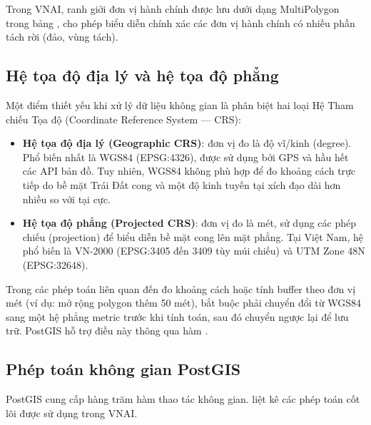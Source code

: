 Trong VNAI, ranh giới đơn vị hành chính được lưu dưới dạng MultiPolygon trong bảng , cho phép biểu diễn chính xác các đơn vị hành chính có nhiều phần tách rời (đảo, vùng tách).

\subsection{Hệ tọa độ địa lý và hệ tọa độ phẳng}

Một điểm thiết yếu khi xử lý dữ liệu không gian là phân biệt hai loại Hệ Tham chiếu Tọa độ (Coordinate Reference System --- CRS):
\begin{itemize}[leftmargin=*]
\item \textbf{Hệ tọa độ địa lý (Geographic CRS)}: đơn vị đo là độ vĩ/kinh (degree). Phổ biến nhất là WGS84 (EPSG:4326), được sử dụng bởi GPS và hầu hết các API bản đồ. Tuy nhiên, WGS84 không phù hợp để đo khoảng cách trực tiếp do bề mặt Trái Đất cong và một độ kinh tuyến tại xích đạo dài hơn nhiều so với tại cực.
\item \textbf{Hệ tọa độ phẳng (Projected CRS)}: đơn vị đo là mét, sử dụng các phép chiếu (projection) để biểu diễn bề mặt cong lên mặt phẳng. Tại Việt Nam, hệ phổ biến là VN-2000 (EPSG:3405 đến 3409 tùy múi chiếu) và UTM Zone 48N (EPSG:32648).
\end{itemize}

Trong các phép toán liên quan đến đo khoảng cách hoặc tính buffer theo đơn vị mét (ví dụ: mở rộng polygon thêm 50 mét), bắt buộc phải chuyển đổi từ WGS84 sang một hệ phẳng metric trước khi tính toán, sau đó chuyển ngược lại để lưu trữ. PostGIS hỗ trợ điều này thông qua hàm .

\subsection{Phép toán không gian PostGIS}

PostGIS cung cấp hàng trăm hàm thao tác không gian.  liệt kê các phép toán cốt lõi được sử dụng trong VNAI.

